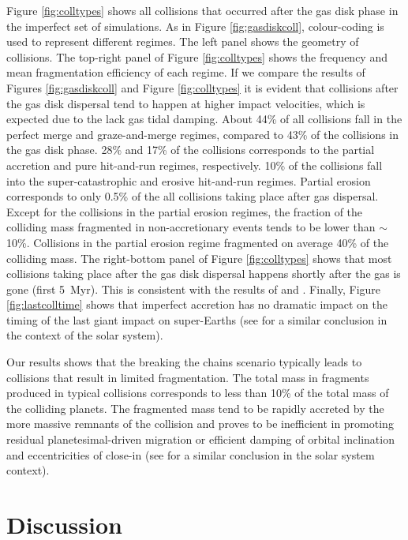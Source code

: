 \documentclass[fleqn,usenatbib]{mnras}
\begin{document}
Figure \ref{fig:colltypes} shows all collisions that occurred after the gas disk phase in the imperfect set of simulations. As in Figure \ref{fig:gasdiskcoll}, colour-coding is used to represent different regimes. The left panel shows the geometry of collisions. The top-right panel of Figure \ref{fig:colltypes} shows the frequency and mean fragmentation efficiency of each regime. If we compare the results of  Figures \ref{fig:gasdiskcoll} and Figure \ref{fig:colltypes} it is evident that collisions after the gas disk dispersal tend to happen at higher impact velocities, which is expected due to the lack gas tidal damping. About 44\% of all collisions fall in the perfect merge and graze-and-merge regimes, compared to 43\% of the collisions in the gas disk phase. 28\% and 17\% of the collisions corresponds to the partial accretion and pure hit-and-run regimes, respectively. 10\% of the collisions fall into the super-catastrophic and erosive hit-and-run regimes. Partial erosion corresponds to only 0.5\% of the all collisions taking place after gas dispersal. Except for the collisions in the partial erosion regimes, the fraction of the colliding mass fragmented in non-accretionary events tends to be lower than $\sim$10\%. Collisions in the partial erosion regime fragmented on average 40\% of the colliding mass. The right-bottom panel of Figure \ref{fig:colltypes} shows that most collisions taking place after the gas disk dispersal happens shortly after the gas is gone (first 5~Myr). This is consistent with the results of \cite{izidoro2017breaking} and \cite{izidoro2019formation}. Finally,  Figure \ref{fig:lastcolltime} shows that imperfect accretion has no dramatic impact on the timing of the last giant impact on super-Earths (see \cite{kokubogenda10} for a similar conclusion in the context of the solar system). 

Our results shows that the breaking the chains scenario typically leads to collisions that result in limited fragmentation. The total mass in fragments produced in typical collisions corresponds to less than 10\% of the total mass of the colliding planets. The fragmented mass tend to be rapidly accreted by the more massive remnants of the collision and proves to be inefficient in promoting residual planetesimal-driven migration or efficient damping of orbital inclination and eccentricities of close-in (see \cite{deiennoetal19} for a similar conclusion in the solar system context).

\section{Discussion}\label{sec:discussion}
\end{document}
